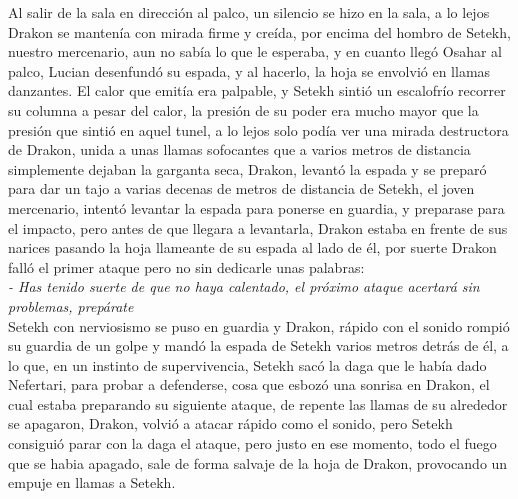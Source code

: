 Al salir de la sala en dirección al palco, un silencio se hizo en la sala, a lo lejos Drakon se mantenía con mirada firme y creída, por encima del hombro de Setekh, nuestro mercenario, aun no sabía lo que le esperaba, y en cuanto llegó Osahar al palco, 
Lucian desenfundó su espada, y al hacerlo, la hoja se envolvió en llamas danzantes. El calor que emitía era palpable, y Setekh sintió un escalofrío recorrer su columna a pesar del calor, la presión de su poder era mucho mayor que la presión que sintió en aquel tunel, a lo lejos solo podía ver
una mirada destructora de Drakon, unida a unas llamas sofocantes que a varios metros de distancia simplemente dejaban la garganta seca, Drakon, levantó la espada y se preparó para dar un tajo a varias decenas de metros de distancia de Setekh, el joven mercenario, intentó levantar la espada para ponerse en guardia,
y preparase para el impacto, pero antes de que llegara a levantarla, Drakon estaba en frente de sus narices pasando la hoja llameante de su espada al lado de él, por suerte Drakon falló el primer ataque pero no sin dedicarle unas palabras:\\
\textit{- Has tenido suerte de que no haya calentado, el próximo ataque acertará sin problemas, prepárate}\\
Setekh con nerviosismo se puso en guardia y Drakon, rápido con el sonido rompió su guardia de un golpe y mandó la espada de Setekh varios metros detrás de él, a lo que, en un instinto de supervivencia, Setekh sacó la daga que le había dado Nefertari, para probar a defenderse, cosa que esbozó una sonrisa en Drakon, el cual
estaba preparando su siguiente ataque, de repente las llamas de su alrededor se apagaron, Drakon, volvió a atacar rápido como el sonido, pero Setekh consiguió parar con la daga el ataque, pero justo en ese momento, todo el fuego que se habia apagado, sale de forma salvaje de la hoja de Drakon, provocando un empuje en llamas a Setekh.

